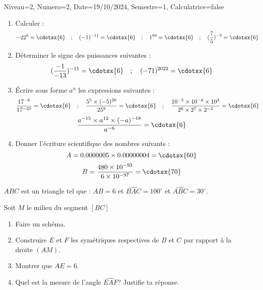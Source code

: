 \documentclass[a4paper,12pt]{article}
\begin{document}
\begin{Maquette}[DS]{Niveau=2, Numero=2, Date=19/10/2024, Semestre=1, Calculatrice=false}

\begin{exercice}
\begin{enumerate}
\item{} Calculer : 
\[
 -22^{0}=\cdotsx{6} \quad; \quad (-1)^{-11}=\cdotsx{6} \quad; \quad 1^{89}=\cdotsx{6} \quad; \quad (\dfrac{7}{5})^{-3}=\cdotsx{6}
\]
\item{} Déterminer le signe des puissances suivantes :
\[ (\dfrac{-1}{-13})^{-11}=\cdotsx{6} \quad; \quad 
	(-71)^{2022}=\cdotsx{6}
\] 
\item{} Écrire sous forme $a^{n}$ les expressions suivantes :
\[\dfrac{17^{-6}}{17^{-25}}=\cdotsx{6}\quad; \quad
	\dfrac{5^{5}\times (-5)^{20}}{25^{9}}=\cdotsx{6}\quad; \quad
	\dfrac{10^{-5}\times 10^{-8}\times 10^{3}}{2^{6}\times 2^{7}\times 2^{-3}}=\cdotsx{6}
\]
\[
\dfrac{a^{-15}\times a^{12}\times (-a)^{-18}}{a^{-6}}=\cdotsx{6}
\]
\item{} Donner l'écriture scientifique des nombres suivants :
\[
	A=0.0000005\times 0.00000004=\cdotsx{60} 
\]
\[	
	B=\dfrac{480\times 10^{-93}}{6\times 10^{-97}}=\cdotsx{70}
\]
\end{enumerate}
\end{exercice}

\begin{exercice}
$ABC$ est un triangle tel que : $AB=6$ et $\widehat{BAC}=100^{\circ}$ et $\widehat{ABC}=30^{\circ}$.

Soit $M$ le milieu du segment $[BC]$ 
\begin{enumerate}
\item{} Faire un schéma.
\item{} Construire $E$ et $F$ les symétriques respectives   de $B$ et $C$ par rapport à la droite $(AM)$.
\item{} Montrer que $AE=6$.
\item{} Quel est la mesure de l'angle $\widehat{EAF}$? Justifie ta réponse.
\end{enumerate}
\end{exercice}
\end{Maquette}
\end{document}
